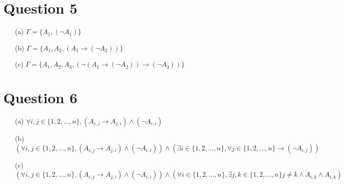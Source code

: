 \documentclass[10pt]{article}
\begin{document}
\section*{Question 5}
\begin{itemize}
    \item [(a)] $\Gamma=\{A_1,(\lnot A_1)\}$
    \item [(b)] $\Gamma=\{A_1,A_2,(A_1\rightarrow (\lnot A_2))\}$ 
    \item [(c)] $\Gamma=\{A_1,A_2,A_3,(\lnot(A_1\rightarrow (\lnot A_2))\rightarrow (\lnot A_3))\}$
\end{itemize}
\section*{Question 6}
\begin{itemize}
    \item [(a)] $\forall i,j\in\{1,2,\ldots, n\},(A_{i,j}\rightarrow A_{j,i})\land(\lnot A_{i,i})$
    \item [(b)] $(\forall i,j\in\{1,2,\ldots, n\},(A_{i,j}\rightarrow A_{j,i})\land(\lnot A_{i,i}))\land(\exists i\in\{1,2,\ldots, n\},\forall j\in\{1,2,\ldots, n\}\rightarrow(\lnot A_{i,j}))$
    \item [(c)] $(\forall i,j\in\{1,2,\ldots, n\},(A_{i,j}\rightarrow A_{j,i})\land(\lnot A_{i,i}))\land(\forall i\in\{1,2,\ldots, n\},\exists j,k\in\{1,2,\ldots, n\}j\neq k \land A_{i,k}\land A_{i,k})$
\end{itemize}
\end{document}
